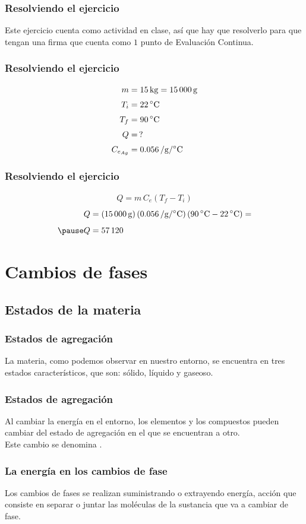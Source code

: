 \documentclass[14pt]{beamer}
\begin{document}
\begin{frame}
\frametitle{Resolviendo el ejercicio}
Este ejercicio cuenta como actividad en clase, así que hay que resolverlo para que tengan una firma que cuenta como $1$ punto de Evaluación Continua.
\end{frame}
\begin{frame}
\frametitle{Resolviendo el ejercicio}
\pause
\begin{align*}
m &= \SI{15}{\kilo\gram} = \SI{15000}{\gram} \\[0.3em]
T_{i} &= \SI{22}{\degreeCelsius} \\[0.3em]
T_{f} &= \SI{90}{\degreeCelsius} \\[0.3em]
Q &= \, ? \\[0.3em]
C_{e_{Ag}} &= \SI{0.056}{\cal\per\gram\per\degreeCelsius}
\end{align*}
\end{frame}
\begin{frame}
\frametitle{Resolviendo el ejercicio}
\pause
\begin{align*}
Q = m \, C_{e} (T_{f} - T_{i})
\end{align*}
\pause
\begin{eqnarray*}
\begin{aligned}
Q &= \left( \SI{15000}{\gram} \right) \left( \SI[per-mode=fraction]{0.056}{\cal\per\gram\per\degreeCelsius} \right) \left( \SI{90}{\degreeCelsius} - \SI{22}{\degreeCelsius} \right) = \\[0.5em] \pause
Q &= \SI{57120}{\cal} 
\end{aligned}
\end{eqnarray*}
\end{frame}

\section{Cambios de fases}
\subsection{Estados de la materia}

\begin{frame}
\frametitle{Estados de agregación}
La materia, como podemos observar en nuestro entorno, se encuentra en tres estados
característicos, que son: sólido, líquido y gaseoso. 
\end{frame}
\begin{frame}
\frametitle{Estados de agregación}
Al cambiar la energía en el entorno, los elementos y los compuestos pueden cambiar del estado de agregación en el que se encuentran a otro.
\\
\bigskip
\pause
Este cambio se denomina .
\end{frame}
\begin{frame}
\frametitle{La energía en los cambios de fase}
Los cambios de fases se realizan suministrando o extrayendo energía, \pause acción que consiste  en separar o juntar las moléculas de la sustancia que va a cambiar de fase.
\end{frame}
\end{document}
